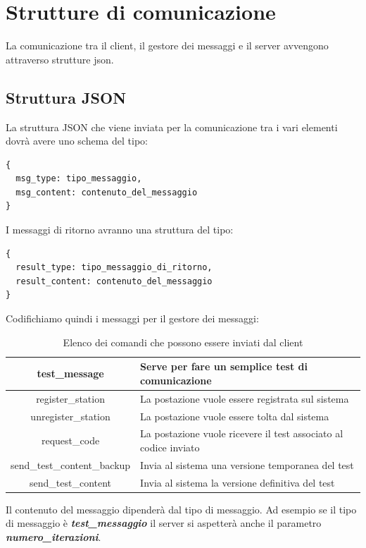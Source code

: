 \chapter{Strutture di comunicazione}
La comunicazione tra il client, il gestore dei messaggi e il server avvengono attraverso strutture json.
\section{Struttura JSON}
La struttura JSON che viene inviata per la comunicazione tra i vari elementi dovr\`a avere uno schema del tipo:
\begin{verbatim}
{
  msg_type: tipo_messaggio,
  msg_content: contenuto_del_messaggio
}
\end{verbatim}

I messaggi di ritorno avranno una struttura del tipo:

\begin{verbatim}
{
  result_type: tipo_messaggio_di_ritorno,
  result_content: contenuto_del_messaggio
}
\end{verbatim}

Codifichiamo quindi i messaggi per il gestore dei messaggi:

\begin{table}[h]
	\centering %
	\caption{Elenco dei comandi che possono essere inviati dal client}
	\begin{tabular}{|c|p{10cm}|}
		\hline
		test\_message & Serve per fare un semplice test di comunicazione\\
		\hline
		register\_station & La postazione vuole essere registrata sul sistema \\
		\hline
		unregister\_station & La postazione vuole essere tolta dal sistema \\
	    \hline
		request\_code & La postazione vuole ricevere il test associato al codice inviato \\
	    \hline
		send\_test\_content\_backup & Invia al sistema una versione temporanea del test \\
	    \hline
		send\_test\_content & Invia al sistema la versione definitiva del test\\
		\hline
	\end{tabular}
\label{tab:tabella_comandi}
\end{table}

Il contenuto del messaggio dipender\`a dal tipo di messaggio. Ad esempio se il tipo di messaggio \`e \textbf{\textit{test\_messaggio}} il server si aspetter\`a anche il parametro \textbf{\textbf{\textit{numero\_iterazioni}}}.

